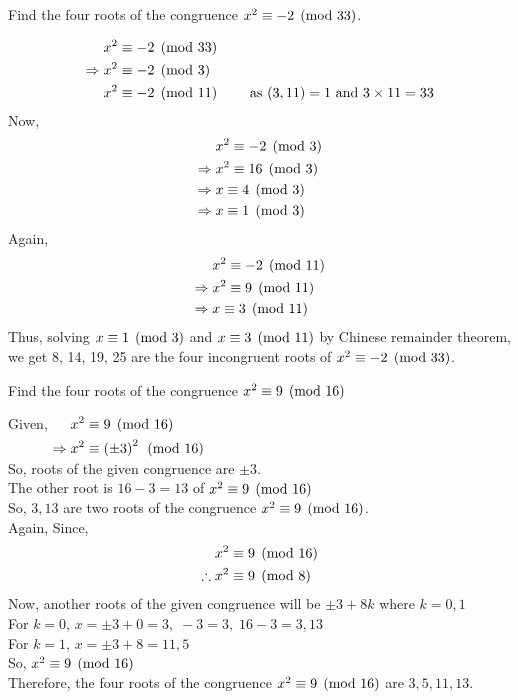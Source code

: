 \documentclass[12pt]{book}
\begin{document}
\begin{qn}
    Find the four roots of the congruence $ x^2\equiv -2 \pmod{33} $.
\end{qn}
\begin{soln}
    \hfill
    \begin{align*}
        &x^2\equiv -2 \pmod{33}\\
        \Rightarrow\;&x^2\equiv -2 \pmod{3}\\
        &x^2\equiv -2 \pmod{11}\qquad\text{ as }(3,11)=1\text{ and }3\times11=33
    \end{align*}
    Now, 
    \begin{align*}
        &x^2\equiv -2 \pmod{3}\\
        \Rightarrow\;&x^2\equiv 16 \pmod{3}\\
        \Rightarrow\;&x\equiv 4 \pmod{3}\\
        \Rightarrow\;&x\equiv 1 \pmod{3}
    \end{align*}
    Again,
    \begin{align*}
        &x^2\equiv -2 \pmod{11}\\
        \Rightarrow\;&x^2\equiv 9 \pmod{11}\\
        \Rightarrow\;&x\equiv 3 \pmod{11}
    \end{align*}
    Thus, solving $ x\equiv 1 \pmod{3} $ and $ x\equiv 3 \pmod{11} $ by Chinese remainder theorem, we get 8, 14, 19, 25 are the four incongruent roots of $ x^2\equiv -2 \pmod{33} $.
\end{soln}
\begin{qn}
    Find the four roots of the congruence $ x^2\equiv 9 \pmod{16} $
\end{qn}
\begin{soln}
    Given, $ \begin{aligned}[t]
        & x^2\equiv 9 \pmod{16}\\
        \Rightarrow\; & x^2\equiv \left( \pm 3 \right)^2 \pmod{16}
    \end{aligned} $\\

    So, roots of the given congruence are $ \pm 3 $.\\
    The other root is $ 16-3=13 $ of $ x^2\equiv 9 \pmod{16} $\\
    So, $ 3,13 $ are two roots of the congruence $ x^2\equiv 9 \pmod{16} $.\\
    Again, Since,
    \begin{align*}
        & x^2\equiv 9 \pmod{16}\\
        \therefore\;& x^2\equiv 9 \pmod{8}
    \end{align*}
    Now, another roots of the given congruence will be $ \pm 3+8k $ where $ k=0,1 $\\
    For $ k=0 $, $ x=\pm3+0=3,\;-3=3,\;16-3=3,13 $\\
    For $ k=1 $, $ x=\pm3+8=11,5 $\\
    So, $ x^2\equiv 9 \pmod{16} $\\
    Therefore, the four roots of the congruence $ x^2\equiv 9 \pmod{16} $ are $ 3,5,11,13 $.
\end{soln}
\end{document}
